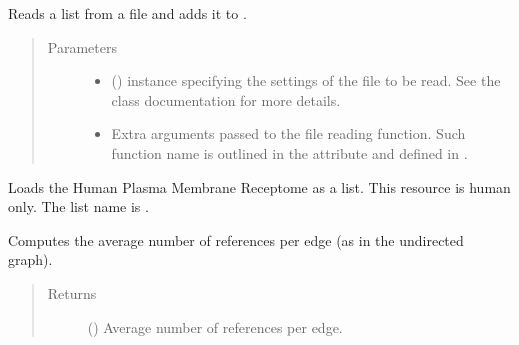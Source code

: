 \documentclass[letterpaper,10pt,english]{sphinxmanual}
\begin{document}
\begin{fulllineitems}
\begin{fulllineitems}
\label{\detokenize{main:pypath.main.PyPath.read_list_file}}
Reads a list from a file and adds it to
.
\begin{quote}\begin{description}
\item[{Parameters}] \leavevmode\begin{itemize}
\item {} 
 () \textendash{}  instance specifying
the settings of the file to be read. See the class
documentation for more details.

\item {} 
 \textendash{} Extra arguments passed to the file reading function. Such
function name is outlined in the
 attribute and
defined in .

\end{itemize}

\end{description}\end{quote}

\end{fulllineitems}


\begin{fulllineitems}
\label{\detokenize{main:pypath.main.PyPath.receptors_list}}
Loads the Human Plasma Membrane Receptome as a list. This
resource is human only.
The list name is .

\end{fulllineitems}


\begin{fulllineitems}
\label{\detokenize{main:pypath.main.PyPath.reference_edge_ratio}}
Computes the average number of references per edge (as in the
undirected graph).
\begin{quote}\begin{description}
\item[{Returns}] \leavevmode
() \textendash{} Average number of references per edge.


\end{description}
\end{quote}
\end{fulllineitems}
\end{fulllineitems}
\end{document}
